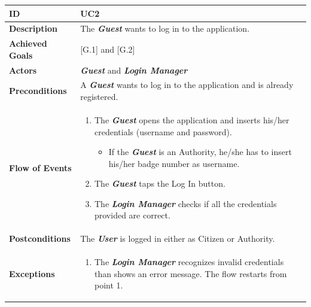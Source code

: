 \documentclass{report}
\begin{document}
\begin{tabularx}{\linewidth}{| l | X |}
	\hline
	\textbf{ID} & UC2\\
	
	\hline
	\textbf{Description} & The \textbf{\textit{Guest}} wants to log in to the application.\\

	\hline
	\textbf{Achieved Goals} & {[G.1]} and {[G.2]}\\
	
	\hline
	\textbf{Actors} & \textbf{\textit{Guest}} and \textbf{\textit{Login Manager}} \\
	
	\hline
	\textbf{Preconditions} & A \textbf{\textit{Guest}} wants to log in to the application and is already registered.\\
	
	\hline
	\textbf{Flow of Events} & \parbox{0.7\textwidth}{
		\begin{enumerate}
			\item The \textbf{\textit{Guest}} opens the application and inserts his/her credentials (username and password).
			\begin{itemize}
				\item If the \textbf{\textit{Guest}} is an Authority, he/she has to insert his/her badge number as username.
			\end{itemize}
			\item The \textbf{\textit{Guest}} taps the Log In button.			
			\item The \textbf{\textit{Login Manager}} checks if all the credentials provided are correct.
	\end{enumerate}}\\
	
	\hline
	\textbf{Postconditions} & The \textbf{\textit{User}} is logged in either as Citizen or Authority.\\
	
	\hline
	\textbf{Exceptions} & \parbox{0.7\textwidth}{ 
		\begin{enumerate}
			\item The \textbf{\textit{Login Manager}} recognizes invalid credentials than shows an error message. The flow restarts from point 1. 
		\end{enumerate}}\\
	
	\hline
\end{tabularx}
\end{document}
